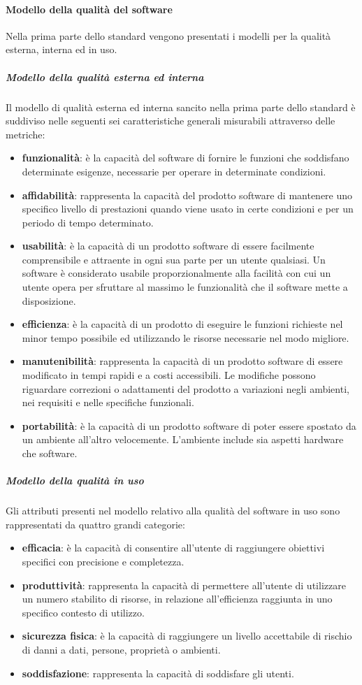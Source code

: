 			\paragraph{Modello della qualità del software}
			Nella prima parte dello standard vengono presentati i modelli per la qualità esterna, interna ed in uso.
				\subparagraph{Modello della qualità esterna ed interna}
				Il modello di qualità esterna ed interna sancito nella prima parte dello standard è suddiviso nelle seguenti sei caratteristiche generali misurabili attraverso delle metriche:
				\begin{itemize}
					\item \textbf{funzionalità}: è la capacità del software di fornire le funzioni che soddisfano determinate esigenze, necessarie per operare in determinate condizioni. 
					\item \textbf{affidabilità}: rappresenta la capacità del prodotto software di mantenere uno specifico livello di prestazioni quando viene usato in certe condizioni e per un periodo di tempo determinato.
					\item \textbf{usabilità}: è la capacità di un prodotto software di essere facilmente comprensibile e attraente in ogni sua parte per un utente qualsiasi. Un software è considerato usabile proporzionalmente alla facilità con cui un utente opera per sfruttare al massimo le funzionalità che il software mette a disposizione.
					\item \textbf{efficienza}: è la capacità di un prodotto di eseguire le funzioni richieste nel minor tempo possibile ed utilizzando le risorse necessarie nel modo migliore.
					\item \textbf{manutenibilità}: rappresenta la capacità di un prodotto software di essere modificato in tempi rapidi e a costi accessibili. Le modifiche possono riguardare correzioni o adattamenti del prodotto a variazioni negli ambienti, nei requisiti e nelle specifiche funzionali.
					\item \textbf{portabilità}: è la capacità di un prodotto software di poter essere spostato da un ambiente all'altro velocemente. L'ambiente include sia aspetti hardware che software.
				\end{itemize}
				
				\subparagraph{Modello della qualità in uso}
				Gli attributi presenti nel modello relativo alla qualità del software in uso sono rappresentati da quattro grandi categorie:
				\begin{itemize}
					\item \textbf{efficacia}: è la capacità di consentire all'utente di raggiungere obiettivi specifici con precisione e completezza.
					\item \textbf{produttività}: rappresenta la capacità di permettere all'utente di utilizzare un numero stabilito di risorse, in relazione all'efficienza raggiunta in uno specifico contesto di utilizzo.
					\item \textbf{sicurezza fisica}: è la capacità di raggiungere un livello accettabile di rischio di danni a dati, persone, proprietà o ambienti.
					\item \textbf{soddisfazione}: rappresenta la capacità di soddisfare gli utenti.
				\end{itemize}
